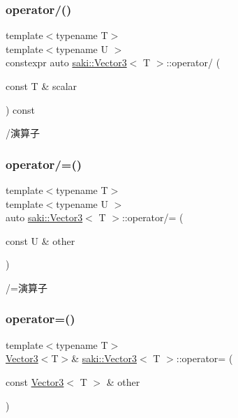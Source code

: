 \subsubsection{\texorpdfstring{operator/()}{operator/()}}
{\footnotesize\ttfamily template$<$typename T$>$ \\
template$<$typename U $>$ \\
constexpr auto \mbox{\hyperlink{classsaki_1_1_vector3}{saki\+::\+Vector3}}$<$ T $>$\+::operator/ (\begin{DoxyParamCaption}\item[{const T \&}]{scalar }\end{DoxyParamCaption}) const\hspace{0.3cm}{\ttfamily [inline]}}



/演算子 

\mbox{\label{classsaki_1_1_vector3_a948031e81e8a2223a2814c35dd7429b6}} 
\subsubsection{\texorpdfstring{operator/=()}{operator/=()}}
{\footnotesize\ttfamily template$<$typename T$>$ \\
template$<$typename U $>$ \\
auto \mbox{\hyperlink{classsaki_1_1_vector3}{saki\+::\+Vector3}}$<$ T $>$\+::operator/= (\begin{DoxyParamCaption}\item[{const U \&}]{other }\end{DoxyParamCaption})\hspace{0.3cm}{\ttfamily [inline]}}



/=演算子 

\mbox{\label{classsaki_1_1_vector3_a8a103fbd68dd37b36ffc030e36745c97}} 
\subsubsection{\texorpdfstring{operator=()}{operator=()}\hspace{0.1cm}{\footnotesize\ttfamily [1/4]}}
{\footnotesize\ttfamily template$<$typename T$>$ \\
\mbox{\hyperlink{classsaki_1_1_vector3}{Vector3}}$<$T$>$\& \mbox{\hyperlink{classsaki_1_1_vector3}{saki\+::\+Vector3}}$<$ T $>$\+::operator= (\begin{DoxyParamCaption}\item[{const \mbox{\hyperlink{classsaki_1_1_vector3}{Vector3}}$<$ T $>$ \&}]{other }\end{DoxyParamCaption})\hspace{0.3cm}{\ttfamily [inline]}}



